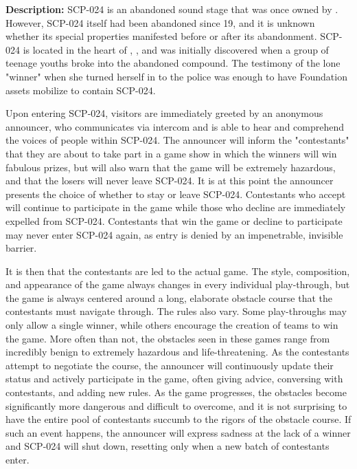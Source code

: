\textbf{Description:} SCP-024 is an abandoned sound stage that was once owned by . However, SCP-024 itself had been abandoned since 19, and it is unknown whether its special properties manifested before or after its abandonment. SCP-024 is located in the heart of , , and was initially discovered when a group of teenage youths broke into the abandoned compound. The testimony of the lone "winner" when she turned herself in to the police was enough to have Foundation assets mobilize to contain SCP-024.

Upon entering SCP-024, visitors are immediately greeted by an anonymous announcer, who communicates via intercom and is able to hear and comprehend the voices of people within SCP-024. The announcer will inform the "contestants" that they are about to take part in a game show in which the winners will win fabulous prizes, but will also warn that the game will be extremely hazardous, and that the losers will never leave SCP-024. It is at this point the announcer presents the choice of whether to stay or leave SCP-024. Contestants who accept will continue to participate in the game while those who decline are immediately expelled from SCP-024. Contestants that win the game or decline to participate may never enter SCP-024 again, as entry is denied by an impenetrable, invisible barrier.

It is then that the contestants are led to the actual game. The style, composition, and appearance of the game always changes in every individual play-through, but the game is always centered around a long, elaborate obstacle course that the contestants must navigate through. The rules also vary. Some play-throughs may only allow a single winner, while others encourage the creation of teams to win the game. More often than not, the obstacles seen in these games range from incredibly benign to extremely hazardous and life-threatening. As the contestants attempt to negotiate the course, the announcer will continuously update their status and actively participate in the game, often giving advice, conversing with contestants, and adding new rules. As the game progresses, the obstacles become significantly more dangerous and difficult to overcome, and it is not surprising to have the entire pool of contestants succumb to the rigors of the obstacle course. If such an event happens, the announcer will express sadness at the lack of a winner and SCP-024 will shut down, resetting only when a new batch of contestants enter.

